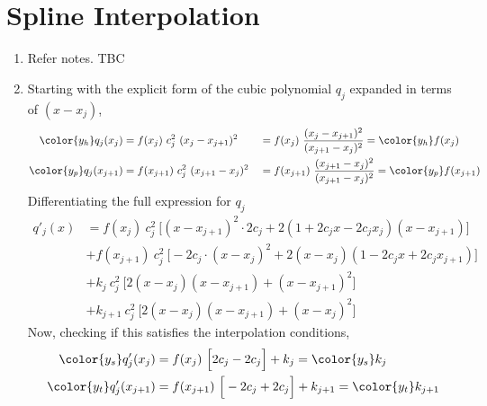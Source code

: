 \section{Spline Interpolation}

\begin{enumerate}
    \item Refer notes. TBC

    \item Starting with the explicit form of the cubic polynomial $ q_j $ expanded in
          terms of $ (x - x_j) $,
          \begin{align}
              \color{y_h} q_j(x_j)     & = f(x_j)\ c_j^2\ (x_j - x_{j+1})^2     &
                                       & = f(x_j)\ \frac{(x_j - x_{j+1})^2}
              {(x_{j+1} - x_j)^2} = \color{y_h} f(x_j)                            \\
              \color{y_p} q_j(x_{j+1}) & = f(x_{j+1})\ c_j^2\ (x_{j+1} - x_j)^2 &
                                       & = f(x_{j+1})\ \frac{(x_{j+1} - x_j)^2}
              {(x_{j+1} - x_j)^2} = \color{y_p} f(x_{j+1})                        \\
          \end{align}
          Differentiating the full expression for $ q_j $
          \begin{align}
              q'_j(x) & = f(x_j)\ c_j^2\ \Big[(x - x_{j+1})^2 \cdot 2c_j
              + 2(1 + 2c_j x - 2c_jx_j)(x - x_{j+1})\Big]                            \\
                      & + f(x_{j+1})\ c_j^2\ \Big[ -2c_j \cdot (x - x_j)^2
              + 2(x - x_j)(1 - 2c_j x + 2c_j x_{j+1})\Big]                           \\
                      & + k_j\ c_j^2\ \Big[ 2(x-x_j)(x - x_{j+1}) + (x - x_{j+1})^2
              \Big]                                                                  \\
                      & + k_{j+1}\ c_j^2\ \Big[2(x - x_j)(x - x_{j+1}) + (x - x_j)^2
                  \Big]
          \end{align}
          Now, checking if this satisfies the interpolation conditions,
          \begin{align}
              \color{y_s}q'_j(x_j)      & = f(x_j)\ \Big[ 2c_j - 2c_j \Big]
              + k_j  = \color{y_s}k_j                                            \\
              \color{y_t} q'_j(x_{j+1}) & = f(x_{j+1})\ \Big[ -2c_j + 2c_j \Big]
              + k_{j+1} = \color{y_t} k_{j+1}
          \end{align}


\end{enumerate}

